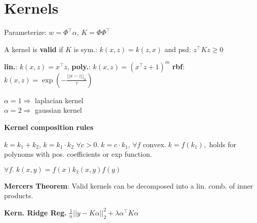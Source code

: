 \section*{Kernels}

Parameterize: $w = \Phi^\top \alpha$, $K = \Phi \Phi^\top$

A kernel is \textbf{valid} if $K$ is sym.: $k(x,z) = k(z,x)$ and psd: $z^\top K z \geq 0$

\textbf{lin.}: $k(x, z) = x^\top z$, \textbf{poly.}: $k(x, z) = (x^\top z + 1)^m$
\textbf{rbf}: $k(x, z) = \exp ( -\frac{||x - z||_\alpha}{\tau} )$

$\alpha = 1 \Rightarrow $ laplacian kernel \\
$\alpha = 2 \Rightarrow $ gaussian kernel

\textbf{Kernel composition rules}

$k = k_1 + k_2$, \quad $k = k_1 \cdot k_2$ \quad $\forall c > 0. \; k = c \cdot k_1$,
$\forall f \text{ convex}. \; k = f(k_1), $ holds for polynoms with pos. coefficients or exp function. 

$\forall f. \; k(x,y) = f(x)k_1(x,y)f(y)$

\textbf{Mercers Theorem}: Valid kernels can be decomposed into a lin. comb. of inner products.

\textbf{Kern. Ridge Reg.}
$\frac{1}{n} ||y - K\alpha ||_2^2 + \lambda \alpha^\top K \alpha$
